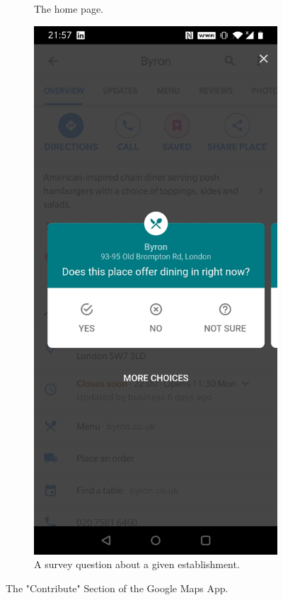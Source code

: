 \begin{figure}[htb!]
\begin{center}
\begin{subfigure}{.3\textwidth}
            \caption{The home page.}
            \label{fig:gmaps_contrib_home}
        \end{subfigure}%
        \begin{subfigure}{.3\textwidth}
            \centering
            \includegraphics[width=0.8\linewidth]{images/gmaps_contribute_survey.jpg}
            \caption{A survey question about a given establishment.}
            \label{fig:gmaps_contrib_survey}
        \end{subfigure}%
        \caption{The "Contribute" Section of the Google Maps App.}
        \label{fig:gmaps_contribute}
    \end{center}
\end{figure}


